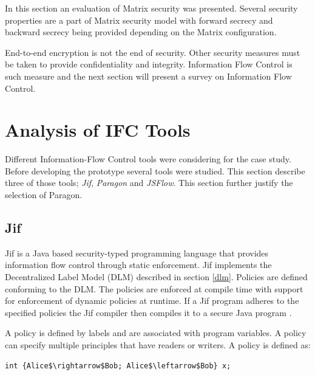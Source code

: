 In this section an evaluation of Matrix security was presented. Several security properties are a part of Matrix security model with forward secrecy and backward secrecy being provided depending on the Matrix configuration.

End-to-end encryption is not the end of security. Other security measures must be taken to provide confidentiality and integrity. Information Flow Control is such measure and the next section will present a survey on Information Flow Control.


\newpage
\section{Analysis of IFC Tools}



Different Information-Flow Control tools were considering for the case study. Before developing the prototype several tools were studied. This section describe three of those tools; \emph{Jif}, \emph{Paragon} and \emph{JSFlow}. This section further justify the selection of Paragon.

\subsection{Jif}

Jif is a Java based security-typed programming language that provides information flow control through static enforcement. Jif implements the Decentralized Label Model (DLM) described in section \ref{dlm}. Policies are defined conforming to the DLM. The policies are enforced at compile time with support for enforcement of dynamic policies at runtime. If a Jif program adheres to the specified policies the Jif compiler then compiles it to a secure Java program \cite{jifmanual}. 

A policy is defined by labels and are associated with program variables. A policy can specify multiple principles that have readers or writers. A policy is defined as: 

\begin{lstlisting}[mathescape]
int {Alice$\rightarrow$Bob; Alice$\leftarrow$Bob} x;
\end{lstlisting}

